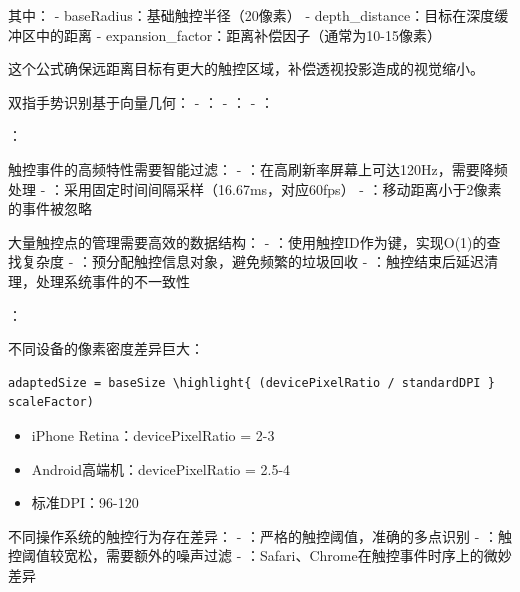 其中： - baseRadius：基础触控半径（20像素） - depth\_distance：目标在深度缓冲区中的距离 - expansion\_factor：距离补偿因子（通常为10-15像素）

这个公式确保远距离目标有更大的触控区域，补偿透视投影造成的视觉缩小。


双指手势识别基于向量几何： - ： - ： - ：

：


触控事件的高频特性需要智能过滤： - ：在高刷新率屏幕上可达120Hz，需要降频处理 - ：采用固定时间间隔采样（16.67ms，对应60fps） - ：移动距离小于2像素的事件被忽略


大量触控点的管理需要高效的数据结构： - ：使用触控ID作为键，实现O(1)的查找复杂度 - ：预分配触控信息对象，避免频繁的垃圾回收 - ：触控结束后延迟清理，处理系统事件的不一致性

：


不同设备的像素密度差异巨大：

\begin{lstlisting}[style=javascript]
adaptedSize = baseSize \highlight{ (devicePixelRatio / standardDPI } scaleFactor)
\end{lstlisting}

\begin{itemize}
\tightlist
\item
  iPhone Retina：devicePixelRatio = 2-3
\item
  Android高端机：devicePixelRatio = 2.5-4
\item
  标准DPI：96-120
\end{itemize}


不同操作系统的触控行为存在差异： - ：严格的触控阈值，准确的多点识别 - ：触控阈值较宽松，需要额外的噪声过滤 - ：Safari、Chrome在触控事件时序上的微妙差异

